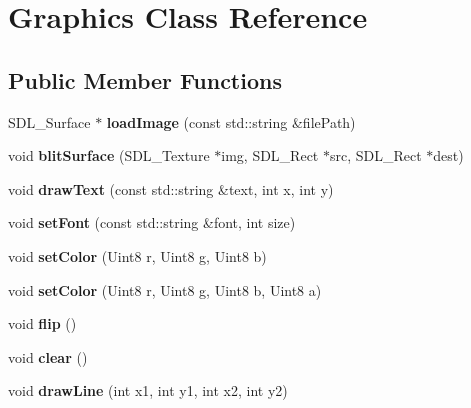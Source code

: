 \hypertarget{class_graphics}{}\section{Graphics Class Reference}
\label{class_graphics}
\subsection*{Public Member Functions}
\begin{DoxyCompactItemize}
\item 
\hypertarget{class_graphics_ac8578764cb1ae151e8e2294917c67128}{}\label{class_graphics_ac8578764cb1ae151e8e2294917c67128} 
S\+D\+L\+\_\+\+Surface $\ast$ {\bfseries load\+Image} (const std\+::string \&file\+Path)
\item 
\hypertarget{class_graphics_ac20be05864dabab875373957544cd6f1}{}\label{class_graphics_ac20be05864dabab875373957544cd6f1} 
void {\bfseries blit\+Surface} (S\+D\+L\+\_\+\+Texture $\ast$img, S\+D\+L\+\_\+\+Rect $\ast$src, S\+D\+L\+\_\+\+Rect $\ast$dest)
\item 
\hypertarget{class_graphics_a3ac4cb173d4661243afe6cff2c9ea0f5}{}\label{class_graphics_a3ac4cb173d4661243afe6cff2c9ea0f5} 
void {\bfseries draw\+Text} (const std\+::string \&text, int x, int y)
\item 
\hypertarget{class_graphics_a2cb7ca43cf024733c813a05240b2157c}{}\label{class_graphics_a2cb7ca43cf024733c813a05240b2157c} 
void {\bfseries set\+Font} (const std\+::string \&font, int size)
\item 
\hypertarget{class_graphics_adee5e3a62f8b9875b0816bed7bc327e5}{}\label{class_graphics_adee5e3a62f8b9875b0816bed7bc327e5} 
void {\bfseries set\+Color} (Uint8 r, Uint8 g, Uint8 b)
\item 
\hypertarget{class_graphics_abce690dc817c4c3648b0a56598acb3a8}{}\label{class_graphics_abce690dc817c4c3648b0a56598acb3a8} 
void {\bfseries set\+Color} (Uint8 r, Uint8 g, Uint8 b, Uint8 a)
\item 
\hypertarget{class_graphics_a8726be9cb0342c5492ff6adbd4bc81fa}{}\label{class_graphics_a8726be9cb0342c5492ff6adbd4bc81fa} 
void {\bfseries flip} ()
\item 
\hypertarget{class_graphics_a5006edbbdc540af376d4787f9d56fbdd}{}\label{class_graphics_a5006edbbdc540af376d4787f9d56fbdd} 
void {\bfseries clear} ()
\item 
\hypertarget{class_graphics_a490f6efb89fe1849ef8bde599e5d647c}{}\label{class_graphics_a490f6efb89fe1849ef8bde599e5d647c} 
void {\bfseries draw\+Line} (int x1, int y1, int x2, int y2)

\end{DoxyCompactItemize}
